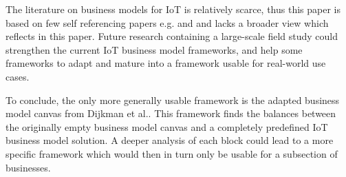 	The literature on business models for IoT is relatively scarce, thus this paper is based on few self referencing papers e.g. \cite{ju} and \cite{dijkman} and lacks a broader view which reflects in this paper. Future research containing a large-scale field study could strengthen the current IoT business model frameworks, and help some frameworks to adapt and mature into a framework usable for real-world use cases.

	To conclude, the only more generally usable framework is the adapted business model canvas from Dijkman et al.. This framework finds the balances between the originally empty business model canvas and a completely predefined IoT business model solution. A deeper analysis of each block could lead to a more specific framework which would then in turn only be usable for a subsection of businesses.

